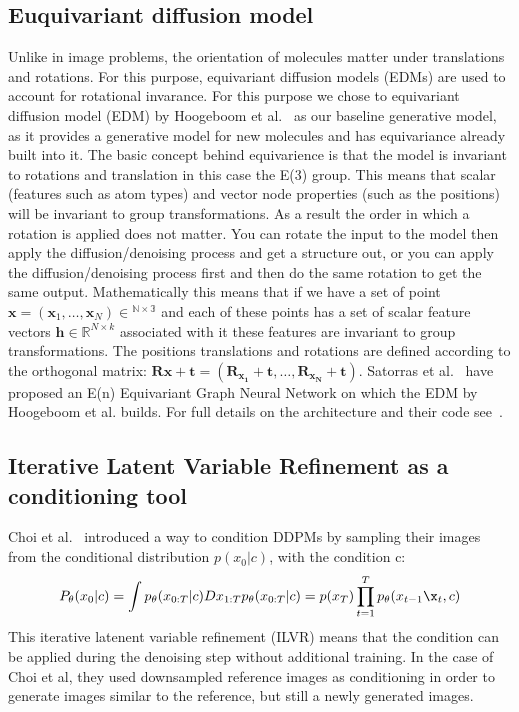 \documentclass[journal=jacsat,manuscript=article]{achemso}
\begin{document}
\subsection*{Euquivariant diffusion model}
Unlike in image problems, the orientation of molecules matter under translations and rotations. For this purpose, equivariant diffusion models (EDMs) are used to account for rotational invarance. For this purpose we chose to equivariant diffusion model (EDM) by Hoogeboom et al.~\cite{hoogeboom2022equivariant} as our baseline generative model, as it provides a generative model for new molecules and has equivariance already built into it.  The basic concept behind equivarience is that the model is invariant to rotations and translation in this case the E(3) group. This means that scalar (features such as atom types) and vector node properties (such as the positions) will be invariant to group transformations. As a result the order in which a rotation is applied does not matter. You can rotate the input to the model then apply the diffusion/denoising process and get a structure out, or you can apply the diffusion/denoising process first and then do the same rotation to get the same output. 
Mathematically this means that if we have a set of point $\mathbf{x} = (\mathbf{x}_1,\ldots,\mathbf{x}_N) \in \mathbb{^{N\times 3}}$ and each of these points has a set of scalar feature vectors $\mathbf{h}\in \mathbb{R}^{N\times k}$ associated with it these features are invariant to group transformations. The positions translations and rotations are defined according to the orthogonal matrix: $\mathbf{Rx + t} = (\mathbf{R_{x_1}+t},\ldots, \mathbf{R_{x_N}+t})$. Satorras et al.~\cite{satorras2022equivariant} have proposed an E(n) Equivariant Graph Neural Network on which the EDM by Hoogeboom et al. builds. For full details on the architecture and their code see~\cite{hoogeboom2022equivariant}. 
\subsection{Iterative Latent Variable Refinement as a conditioning tool}
Choi et al.~\cite{choi2021ilvr} introduced a way to condition DDPMs by sampling their images from the conditional distribution $p(x_0|c)$, with the condition c:
\begin{equation}
    P_\theta(x_0|c) = \int p_\theta(x_{0:T}|c)Dx_{1:T}
    p_{\theta}(x_{0:T}|c)=p(x_T)\prod_{t=1}^{T}p_{\theta}(x_{t-1}\x_t,c)
\end{equation}
This iterative latenent variable refinement (ILVR) means that the condition can be applied during the denoising step without additional training. In the case of Choi et al, they used downsampled reference images as conditioning in order to generate images similar to the reference, but still a newly generated images. 
\end{document}
